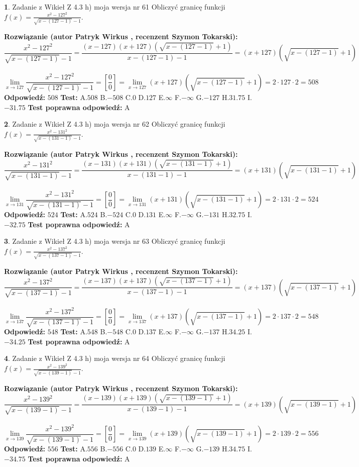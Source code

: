 \documentclass[12pt, a4paper]{article}
\theoremstyle{definition} %
\newtheorem{zad}{}
\newcommand{\zadStart}[1]{\begin{zad}#1\newline}
\newcommand{\zadStop}{\end{zad}}
\newcommand{\rozwStart}[2]{\noindent \textbf{Rozwiązanie (autor #1 , recenzent #2): }\newline}
\newcommand{\rozwStop}{\newline}
\newcommand{\odpStart}{\noindent \textbf{Odpowiedź:}\newline}
\newcommand{\odpStop}{\newline}
\newcommand{\testStart}{\noindent \textbf{Test:}\newline}
\newcommand{\testStop}{\newline}
\newcommand{\kluczStart}{\noindent \textbf{Test poprawna odpowiedź:}\newline}
\newcommand{\kluczStop}{\newline}
\begin{document}
\zadStart{Zadanie z Wikieł Z 4.3 h) moja wersja nr 61}
Obliczyć granicę funkcji $f(x)=\frac{x^{2} - 127^{2}}{\sqrt{x-(127-1)}-1}$.
\zadStop
\rozwStart{Patryk Wirkus}{Szymon Tokarski}
$$\frac{x^{2} - 127^{2}}{\sqrt{x-(127-1)}-1}=\frac{(x-127)(x+127)(\sqrt{x-(127-1)}+1)}{x-(127-1)-1}=(x+127)(\sqrt{x-(127-1)}+1)$$
\\
$$\lim\limits_{x\to 127}\frac{x^{2} - 127^{2}}{\sqrt{x-(127-1)}-1}=[\frac{0}{0}]=
\lim\limits_{x\to 127}(x+127)(\sqrt{x-(127-1)}+1) = 2\cdot127 \cdot 2 = 508$$
\rozwStop
\odpStart
$508$
\odpStop
\testStart
A.$508$
B.$-508$
C.$0$
D.$127$
E.$\infty$
F.$-\infty$
G.$-127$
H.$31.75$
I.$-31.75$
\testStop
\kluczStart
A
\kluczStop



\zadStart{Zadanie z Wikieł Z 4.3 h) moja wersja nr 62}
Obliczyć granicę funkcji $f(x)=\frac{x^{2} - 131^{2}}{\sqrt{x-(131-1)}-1}$.
\zadStop
\rozwStart{Patryk Wirkus}{Szymon Tokarski}
$$\frac{x^{2} - 131^{2}}{\sqrt{x-(131-1)}-1}=\frac{(x-131)(x+131)(\sqrt{x-(131-1)}+1)}{x-(131-1)-1}=(x+131)(\sqrt{x-(131-1)}+1)$$
\\
$$\lim\limits_{x\to 131}\frac{x^{2} - 131^{2}}{\sqrt{x-(131-1)}-1}=[\frac{0}{0}]=
\lim\limits_{x\to 131}(x+131)(\sqrt{x-(131-1)}+1) = 2\cdot131 \cdot 2 = 524$$
\rozwStop
\odpStart
$524$
\odpStop
\testStart
A.$524$
B.$-524$
C.$0$
D.$131$
E.$\infty$
F.$-\infty$
G.$-131$
H.$32.75$
I.$-32.75$
\testStop
\kluczStart
A
\kluczStop



\zadStart{Zadanie z Wikieł Z 4.3 h) moja wersja nr 63}
Obliczyć granicę funkcji $f(x)=\frac{x^{2} - 137^{2}}{\sqrt{x-(137-1)}-1}$.
\zadStop
\rozwStart{Patryk Wirkus}{Szymon Tokarski}
$$\frac{x^{2} - 137^{2}}{\sqrt{x-(137-1)}-1}=\frac{(x-137)(x+137)(\sqrt{x-(137-1)}+1)}{x-(137-1)-1}=(x+137)(\sqrt{x-(137-1)}+1)$$
\\
$$\lim\limits_{x\to 137}\frac{x^{2} - 137^{2}}{\sqrt{x-(137-1)}-1}=[\frac{0}{0}]=
\lim\limits_{x\to 137}(x+137)(\sqrt{x-(137-1)}+1) = 2\cdot137 \cdot 2 = 548$$
\rozwStop
\odpStart
$548$
\odpStop
\testStart
A.$548$
B.$-548$
C.$0$
D.$137$
E.$\infty$
F.$-\infty$
G.$-137$
H.$34.25$
I.$-34.25$
\testStop
\kluczStart
A
\kluczStop



\zadStart{Zadanie z Wikieł Z 4.3 h) moja wersja nr 64}
Obliczyć granicę funkcji $f(x)=\frac{x^{2} - 139^{2}}{\sqrt{x-(139-1)}-1}$.
\zadStop
\rozwStart{Patryk Wirkus}{Szymon Tokarski}
$$\frac{x^{2} - 139^{2}}{\sqrt{x-(139-1)}-1}=\frac{(x-139)(x+139)(\sqrt{x-(139-1)}+1)}{x-(139-1)-1}=(x+139)(\sqrt{x-(139-1)}+1)$$
\\
$$\lim\limits_{x\to 139}\frac{x^{2} - 139^{2}}{\sqrt{x-(139-1)}-1}=[\frac{0}{0}]=
\lim\limits_{x\to 139}(x+139)(\sqrt{x-(139-1)}+1) = 2\cdot139 \cdot 2 = 556$$
\rozwStop
\odpStart
$556$
\odpStop
\testStart
A.$556$
B.$-556$
C.$0$
D.$139$
E.$\infty$
F.$-\infty$
G.$-139$
H.$34.75$
I.$-34.75$
\testStop
\kluczStart
A
\kluczStop
\end{document}
